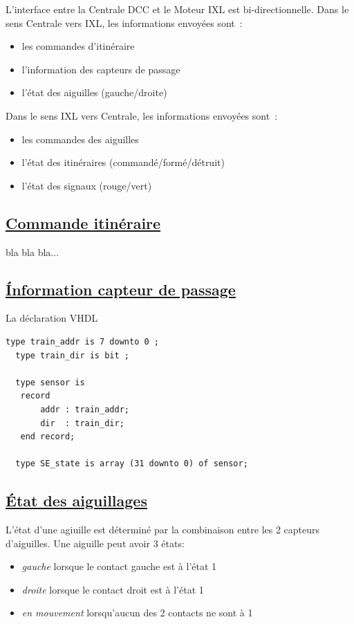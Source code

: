 L'interface entre la Centrale DCC et le Moteur IXL est bi-directionnelle. 
Dans le sens Centrale vers IXL, les informations envoyées sont~:
\begin{itemize}
\item les commandes d'itinéraire
\item l'information des capteurs de passage
\item l'état des aiguilles (gauche/droite)
\end{itemize}

Dans le sens IXL vers Centrale, les informations envoyées sont~:
\begin{itemize}
\item les commandes des aiguilles
\item l'état des itinéraires (commandé/formé/détruit)
\item l'état des signaux (rouge/vert)
\end{itemize}

\subsection{\underline{Commande itinéraire}}
\label{sec:ixl_iti}

bla bla bla...

\subsection{\underline{\'Information capteur de passage}}
\label{sec:ixl_cdv}



\medskip
La déclaration VHDL
\begin{lstlisting}[style=vhdl]
  type train_addr is 7 downto 0 ;
  type train_dir is bit ;

  type sensor is
   record
       addr : train_addr;
       dir  : train_dir;
   end record;

  type SE_state is array (31 downto 0) of sensor;
\end{lstlisting}


\subsection{\underline{\'Etat des aiguillages}}
\label{sec:ixl_aig}

L'état d'une agiuille est déterminé par la combinaison entre les 2 capteurs d'aiguilles.
Une aiguille peut avoir 3 états:
\begin{itemize}
\item \emph{gauche} lorsque le contact gauche est à l'état 1
\item \emph{droite} lorsque le contact droit est à l'état 1
\item \emph{en mouvement} lorsqu'aucun des 2 contacts ne sont à 1
\end{itemize}

